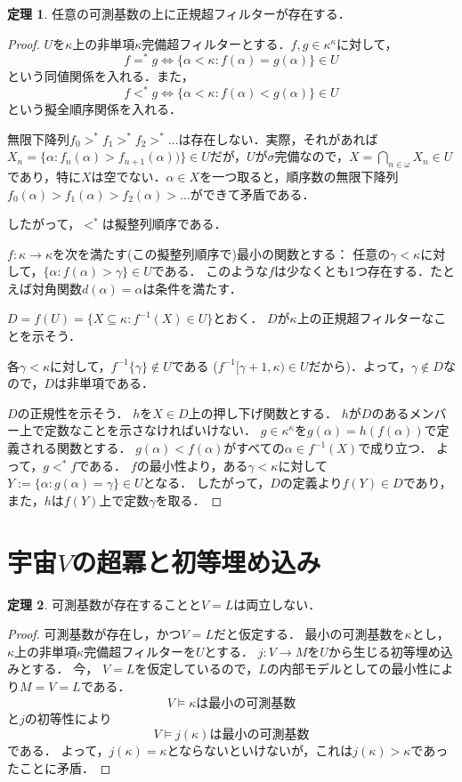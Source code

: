 \documentclass[uplatex]{jsarticle}
\renewcommand\subset{\subseteq}
\theoremstyle{definition}
\newtheorem{thm}{定理}[section]
\begin{document}
	\begin{thm}
		任意の可測基数の上に正規超フィルターが存在する．
	\end{thm}
	\begin{proof}
		$U$を$\kappa$上の非単項$\kappa$完備超フィルターとする．$f, g \in \kappa^\kappa$に対して，
		\[
		f =^* g \iff \{ \alpha < \kappa : f(\alpha) = g(\alpha)\} \in U
		\]
		という同値関係を入れる．また，
		\[
		f <^* g \iff \{ \alpha < \kappa : f(\alpha) < g(\alpha)\} \in U
		\]
		という擬全順序関係を入れる．
		
		無限下降列$f_0 >^* f_1 >^* f_2 >^* \dots$は存在しない．実際，それがあれば$X_n = \{ \alpha : f_n(\alpha) > f_{n+1}(\alpha))\} \in U$だが，$U$が$\sigma$完備なので，$X = \bigcap_{n \in \omega} X_n \in U$であり，特に$X$は空でない．$\alpha \in X$を一つ取ると，順序数の無限下降列$f_0(\alpha) > f_1(\alpha) > f_2(\alpha) > \dots$ができて矛盾である．
		
		したがって，$<^*$は擬整列順序である．
		
		$f \colon \kappa \to \kappa$を次を満たす(この擬整列順序で)最小の関数とする：
		任意の$\gamma < \kappa$に対して，$\{\alpha : f(\alpha) > \gamma \} \in U$である．
		このような$f$は少なくとも1つ存在する．たとえば対角関数$d(\alpha) = \alpha$は条件を満たす．
		
		$D = f(U) = \{ X \subset \kappa : f^{-1}(X) \in U \}$とおく．
		$D$が$\kappa$上の正規超フィルターなことを示そう．
		
		各$\gamma < \kappa$に対して，$f^{-1}\{\gamma\} \not \in U$である ($f^{-1}[\gamma+1, \kappa) \in U$だから)．よって，$\gamma \not \in D$なので，$D$は非単項である．
		
		$D$の正規性を示そう．
		$h$を$X \in D$上の押し下げ関数とする．
		$h$が$D$のあるメンバー上で定数なことを示さなければいけない．
		$g \in \kappa^\kappa$を$g(\alpha) = h(f(\alpha))$で定義される関数とする．
		$g(\alpha) < f(\alpha)$がすべての$\alpha \in f^{-1}(X)$で成り立つ．
		よって，$g <^* f$である．
		$f$の最小性より，ある$\gamma < \kappa$に対して $Y := \{ \alpha : g(\alpha) = \gamma\} \in U$となる．
		したがって，$D$の定義より$f(Y) \in D$であり，また，$h$は$f(Y)$上で定数$\gamma$を取る．
	\end{proof}
	
	\section{宇宙$V$の超冪と初等埋め込み}
	
	\begin{thm}
		可測基数が存在することと$V = L$は両立しない．
	\end{thm}
	\begin{proof}
		可測基数が存在し，かつ$V = L$だと仮定する．
		最小の可測基数を$\kappa$とし，$\kappa$上の非単項$\kappa$完備超フィルターを$U$とする．
		$j \colon V \to M$を$U$から生じる初等埋め込みとする．
		今， $V = L$を仮定しているので，$L$の内部モデルとしての最小性により$M = V = L$である．
		\[V \models \text{$\kappa$は最小の可測基数}\]
		と$j$の初等性により
		\[V \models \text{$j(\kappa)$は最小の可測基数}\]
		である．
		よって，$j(\kappa) = \kappa$とならないといけないが，これは$j(\kappa) > \kappa$であったことに矛盾．
	\end{proof}
	
\end{document}
